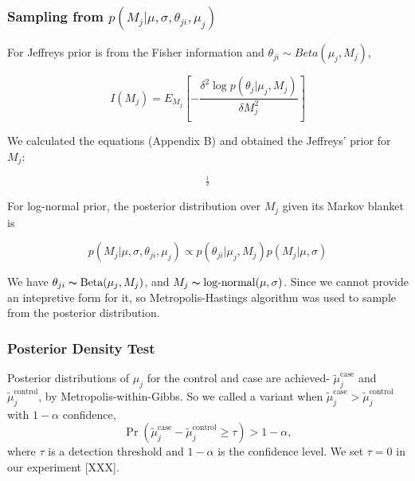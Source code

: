 \documentclass[11pt,reqno]{amsart}
\begin{document}
\subsubsection{Sampling from $p \left( M_{j} |\mu,\sigma, \theta_{ji},\mu_j\right)$}
For Jeffreys prior is from the Fisher information and ${\theta }_{ji}\sim Beta\left( {\mu }_{j},{M}_{j}\right)$,

\begin{equation}\label{equ:JefferyInference}
I\left({M}_{j}\right)={E}_{{M}_{j}}\left[ -\frac{\delta ^{2}\log p\left(\theta _{j}|\mu_{j},M_{j}\right)}{\delta M^{2}_{j}}\right]
\end{equation}

We calculated the equations (Appendix B) and obtained the Jeffreys' prior for $M_j$:

\begin{equation}
[-\left(\Psi_{1}(M_{j}) - \Psi_{1}(\mu_{j} M_{j})\mu_{j}^{2} - \Psi_{1}((1-\mu_{j})M_{j}){(1-\mu_{j})^{2}}\right)]^{\frac{1}{2}}
\end{equation}

For log-normal prior, the posterior distribution over $M_{j}$ given its Markov blanket is

\begin{equation}
	p( M_{j} |\mu, \sigma, \theta_{ji},\mu_j) \propto p(\theta_{ji} | \mu_j, M_j) p(M_{j} | \mu, \sigma)
\end{equation}

We have $ \theta_{ji}\thicksim\text{Beta}(\mu_{j},M_{j})$, and $ M_{j} \thicksim \text{log-normal}(\mu, \sigma)$. Since we cannot provide an intepretive form for it, so Metropolis-Hastings algorithm was used to sample from the posterior distribution.


\subsubsection{Posterior Density Test}\label{sec:hypothesis_test}
Posterior distributions of $\mu_j$ for the control and case are achieved-  $\tilde{\mu}_j^{\text{case}}$ and $\tilde{\mu}_j^{\text{control}}$, by Metropolis-within-Gibbs. So we called a variant when $\tilde{\mu}_j^{\text{case}} > \tilde{\mu}_j^{\text{control}}$ with $1-\alpha$ confidence,
\begin{equation}\label{eqn:bayes_test}
	\Pr( \tilde{\mu}_j^{\text{case}} - \tilde{\mu}_j^{\text{control}} \geq \tau ) > 1-\alpha,
\end{equation}
where $\tau$ is a detection threshold and $1-\alpha$ is the confidence level. We set $\tau = 0$ in our experiment [XXX].
\end{document}
